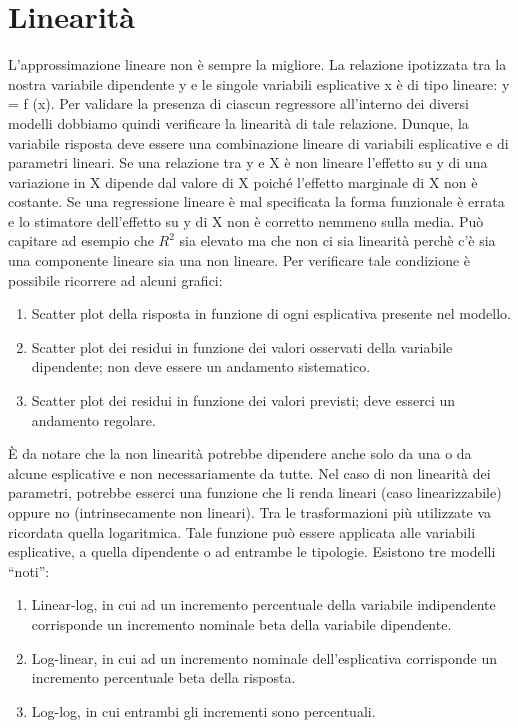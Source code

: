 \documentclass[a4page, 11pt]{article}
\begin{document}
\section{Linearità}

L'approssimazione lineare non è sempre la migliore. La relazione ipotizzata tra la nostra variabile dipendente y e le singole variabili esplicative x è di tipo lineare: y = f (x).
\newline
Per validare la presenza di ciascun regressore all’interno dei diversi modelli dobbiamo quindi verificare la linearità di tale relazione.
\newline
Dunque, la variabile risposta deve essere una combinazione lineare di variabili esplicative e di parametri lineari.
\newline
Se una relazione tra y e X è non lineare l’effetto su y di una variazione in X dipende dal valore di X poiché l’effetto marginale di X non è costante.
Se una regressione lineare è mal specificata la forma funzionale è
errata e lo stimatore dell’effetto su y di X non è corretto nemmeno sulla media. Può capitare ad esempio che $R^{2}$ sia elevato ma che non ci sia linearità perchè c'è sia una componente lineare sia una non lineare. 
\newline
\newline
Per verificare tale condizione è possibile ricorrere ad alcuni grafici:
\begin{enumerate}[noitemsep]
\item Scatter plot della risposta in funzione di ogni esplicativa presente nel modello.
\item Scatter plot dei residui in funzione dei valori osservati della variabile dipendente; non deve essere un andamento sistematico.
\item Scatter plot dei residui in funzione dei valori previsti; deve esserci un andamento regolare.
\end{enumerate}
È da notare che la non linearità potrebbe dipendere anche solo da una o da alcune esplicative e non necessariamente da tutte.
\newline
Nel caso di non linearità dei parametri, potrebbe esserci una funzione che li renda lineari (caso linearizzabile) oppure no (intrinsecamente non lineari).
\newline
Tra le trasformazioni più utilizzate va ricordata quella logaritmica. Tale funzione può essere applicata alle variabili esplicative, a quella dipendente o ad entrambe le tipologie. 
\newline
\newline
Esistono tre modelli ``noti'':
\begin{enumerate}[noitemsep]
\item Linear-log, in cui ad un incremento percentuale della variabile indipendente corrisponde un incremento nominale beta della variabile dipendente.
\item Log-linear, in cui ad un incremento nominale dell’esplicativa corrisponde un incremento percentuale beta della risposta.
\item Log-log, in cui entrambi gli incrementi sono percentuali.
\end{enumerate}
\end{document}
